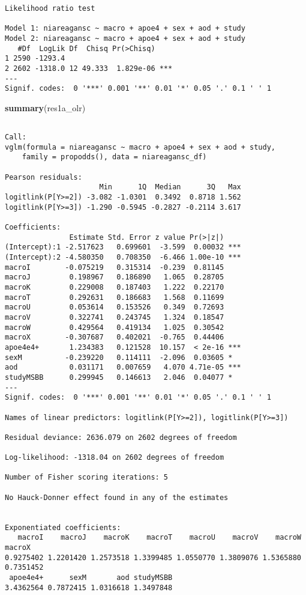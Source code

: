 \documentclass[]{book}
\newenvironment{Shaded}{\begin{snugshade}}{\end{snugshade}}
\newcommand{\KeywordTok}[1]{\textcolor[rgb]{0.13,0.29,0.53}{\textbf{#1}}}
\newcommand{\NormalTok}[1]{#1}
\begin{document}
\begin{verbatim}
Likelihood ratio test

Model 1: niareagansc ~ macro + apoe4 + sex + aod + study
Model 2: niareagansc ~ macro + apoe4 + sex + aod + study
   #Df  LogLik Df  Chisq Pr(>Chisq)    
1 2590 -1293.4                         
2 2602 -1318.0 12 49.333  1.829e-06 ***
---
Signif. codes:  0 '***' 0.001 '**' 0.01 '*' 0.05 '.' 0.1 ' ' 1
\end{verbatim}

\begin{Shaded}
\begin{Highlighting}[]
\KeywordTok{summary}\NormalTok{(res1a_olr)}
\end{Highlighting}
\end{Shaded}

\begin{verbatim}

Call:
vglm(formula = niareagansc ~ macro + apoe4 + sex + aod + study, 
    family = propodds(), data = niareagansc_df)

Pearson residuals:
                      Min      1Q  Median      3Q   Max
logitlink(P[Y>=2]) -3.082 -1.0301  0.3492  0.8718 1.562
logitlink(P[Y>=3]) -1.290 -0.5945 -0.2827 -0.2114 3.617

Coefficients: 
               Estimate Std. Error z value Pr(>|z|)    
(Intercept):1 -2.517623   0.699601  -3.599  0.00032 ***
(Intercept):2 -4.580350   0.708350  -6.466 1.00e-10 ***
macroI        -0.075219   0.315314  -0.239  0.81145    
macroJ         0.198967   0.186890   1.065  0.28705    
macroK         0.229008   0.187403   1.222  0.22170    
macroT         0.292631   0.186683   1.568  0.11699    
macroU         0.053614   0.153526   0.349  0.72693    
macroV         0.322741   0.243745   1.324  0.18547    
macroW         0.429564   0.419134   1.025  0.30542    
macroX        -0.307687   0.402021  -0.765  0.44406    
apoe4e4+       1.234383   0.121528  10.157  < 2e-16 ***
sexM          -0.239220   0.114111  -2.096  0.03605 *  
aod            0.031171   0.007659   4.070 4.71e-05 ***
studyMSBB      0.299945   0.146613   2.046  0.04077 *  
---
Signif. codes:  0 '***' 0.001 '**' 0.01 '*' 0.05 '.' 0.1 ' ' 1

Names of linear predictors: logitlink(P[Y>=2]), logitlink(P[Y>=3])

Residual deviance: 2636.079 on 2602 degrees of freedom

Log-likelihood: -1318.04 on 2602 degrees of freedom

Number of Fisher scoring iterations: 5 

No Hauck-Donner effect found in any of the estimates


Exponentiated coefficients:
   macroI    macroJ    macroK    macroT    macroU    macroV    macroW    macroX 
0.9275402 1.2201420 1.2573518 1.3399485 1.0550770 1.3809076 1.5365880 0.7351452 
 apoe4e4+      sexM       aod studyMSBB 
3.4362564 0.7872415 1.0316618 1.3497848 
\end{verbatim}
\end{document}
